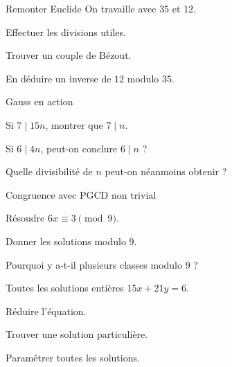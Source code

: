 \begingroup\renewcommand{\otBesoinPlace}[1]{}\begin{minipage}{\linewidth}
\begin{exercice}[2]{Remonter Euclide}
On travaille avec $35$ et $12$.
\begin{questions}
\item Effectuer les divisions utiles.
\item Trouver un couple de Bézout.
\item En déduire un inverse de $12$ modulo $35$.
\end{questions}
\end{exercice}
\begin{exercice}[2]{Gauss en action}

\begin{questions}
\item Si $7\mid15n$, montrer que $7\mid n$.
\item Si $6\mid4n$, peut-on conclure $6\mid n$ ?
\item Quelle divisibilité de $n$ peut-on néanmoins obtenir ?
\end{questions}
\end{exercice}
\begin{exercice}[2]{Congruence avec PGCD non trivial}

\begin{questions}
\item Résoudre $6x\equiv3\pmod9$.
\item Donner les solutions modulo $9$.
\item Pourquoi y a-t-il plusieurs classes modulo $9$ ?
\end{questions}
\end{exercice}
\begin{exercice}[2]{Toutes les solutions entières}
$15x+21y=6$.
\begin{questions}
\item Réduire l’équation.
\item Trouver une solution particulière.
\item Paramétrer toutes les solutions.
\end{questions}
\end{exercice}
\end{minipage}\endgroup
\clearpage
{}

